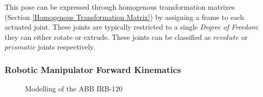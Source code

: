 \documentclass{UoNMCHA}
\numberwithin{equation}{section}
\begin{document}
This pose can be expressed through homogenous transformation matrixes (Section \ref{Homogenous Transformation Matrix}) by assigning a frame to each actuated joint. These joints are typically restricted to a single \textit{Degree of Freedom}: they can either rotate or extrude. These joints can be classified as $revolute$ or $prismatic$ joints respectively. \\

\newpage
\subsubsection{Robotic Manipulator Forward Kinematics}

\begin{figure}[H]%
	
	\centering
	
	\hfil
	
	\caption{Modelling of the ABB IRB-120}%
	
	\label{fig:ABBrobotAnthro}%
	
\end{figure}
\end{document}
